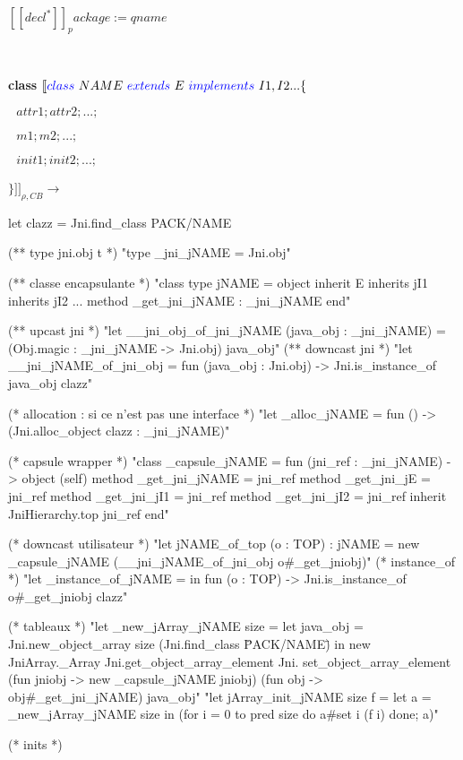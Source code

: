 \documentclass[a4paper, 11pt]{report}
\begin{document}
$[\![ decl^* ]\!]_package:=qname$ 

\ 
\newline

\textbf{class}
\newline
\noindent
$[\![ {\color{blue}class}\ NAME\ 
 {\color{blue}extends}\  E \ 
 {\color{blue}implements}\  I1,I2... \{$

 $ \ \ \ attr1; attr2; ...;$

  $\ \ \ m1; m2; ...;$

  $\ \ \ init1; init2; ...;$

 $\} ]\!]_{\rho,CB}\longrightarrow$
\ 
\newline

\begin{OCaml}
let clazz = Jni.find_class PACK/NAME

(** type jni.obj t *)
"type _jni_jNAME = Jni.obj"

(** classe encapsulante *)
"class type jNAME =
   object inherit E
   inherits jI1
   inherits jI2 ...
   method _get_jni_jNAME : _jni_jNAME
   end"

(** upcast jni *)
"let __jni_obj_of_jni_jNAME (java_obj : _jni_jNAME) =
   (Obj.magic : _jni_jNAME -> Jni.obj) java_obj"
(** downcast jni *)
"let __jni_jNAME_of_jni_obj =
   fun (java_obj : Jni.obj) ->
     Jni.is_instance_of java_obj clazz"
 
(* allocation : si ce n'est pas une interface *)
"let _alloc_jNAME =
     fun () -> (Jni.alloc_object clazz : _jni_jNAME)"

(* capsule wrapper *)
"class _capsule_jNAME = fun (jni_ref : _jni_jNAME) ->
    object (self)
      method _get_jni_jNAME = jni_ref
      method _get_jni_jE = jni_ref
      method _get_jni_jI1 = jni_ref
      method _get_jni_jI2 = jni_ref
      inherit JniHierarchy.top jni_ref
    end"

(* downcast utilisateur *)
"let jNAME_of_top (o : TOP) : jNAME =
    new _capsule_jNAME (__jni_jNAME_of_jni_obj o#_get_jniobj)"
(* instance_of *)
"let _instance_of_jNAME =
    in fun (o : TOP) -> Jni.is_instance_of o#_get_jniobj clazz"

(* tableaux *)
"let _new_jArray_jNAME size =
    let java_obj = Jni.new_object_array size (Jni.find_class \"PACK/NAME\")
    in
      new JniArray._Array Jni.get_object_array_element Jni.
        set_object_array_element (fun jniobj -> new _capsule_jNAME jniobj)
        (fun obj -> obj#_get_jni_jNAME) java_obj"
"let jArray_init_jNAME size f =
    let a = _new_jArray_jNAME size
    in (for i = 0 to pred size do a#set i (f i) done; a)"

(* inits *)
\end{OCaml}
\end{document}
